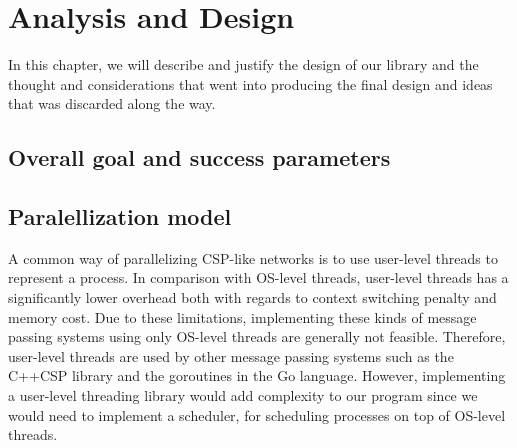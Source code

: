\chapter{Analysis and Design}
In this chapter, we will describe and justify the design of our library and the
thought and considerations that went into producing the final design
and ideas that was discarded along the way.

\section{Overall goal and success parameters}





\section{Paralellization model}

A common way of parallelizing CSP-like networks is to use user-level
threads to represent a process. In comparison with OS-level threads,
user-level threads has a significantly lower overhead both with
regards to context switching penalty and memory cost. Due to these
limitations, implementing these kinds of message passing systems using
only OS-level threads are generally not feasible. Therefore,
user-level threads are used by other message passing systems such as
the C++CSP library\cite{brown2003introduction} and the goroutines in
the Go language\cite{deshpandeanalysis}. However, implementing a
user-level threading library would add complexity to our
program since we would need to implement a scheduler, for scheduling
processes on top of OS-level threads.

